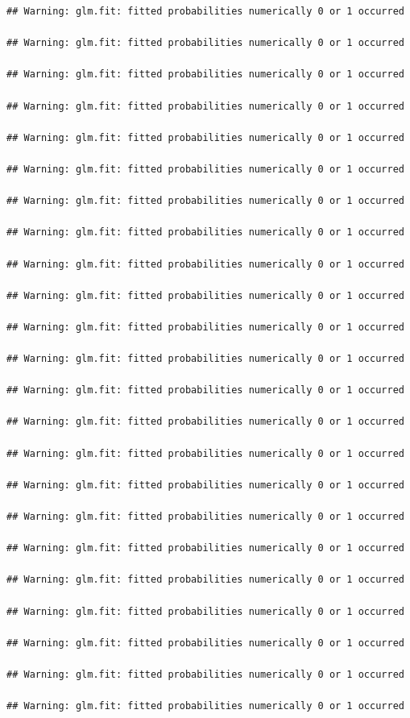 \documentclass[]{book}
\begin{document}
\begin{verbatim}
## Warning: glm.fit: fitted probabilities numerically 0 or 1 occurred

## Warning: glm.fit: fitted probabilities numerically 0 or 1 occurred

## Warning: glm.fit: fitted probabilities numerically 0 or 1 occurred

## Warning: glm.fit: fitted probabilities numerically 0 or 1 occurred

## Warning: glm.fit: fitted probabilities numerically 0 or 1 occurred

## Warning: glm.fit: fitted probabilities numerically 0 or 1 occurred

## Warning: glm.fit: fitted probabilities numerically 0 or 1 occurred

## Warning: glm.fit: fitted probabilities numerically 0 or 1 occurred

## Warning: glm.fit: fitted probabilities numerically 0 or 1 occurred

## Warning: glm.fit: fitted probabilities numerically 0 or 1 occurred

## Warning: glm.fit: fitted probabilities numerically 0 or 1 occurred

## Warning: glm.fit: fitted probabilities numerically 0 or 1 occurred

## Warning: glm.fit: fitted probabilities numerically 0 or 1 occurred

## Warning: glm.fit: fitted probabilities numerically 0 or 1 occurred

## Warning: glm.fit: fitted probabilities numerically 0 or 1 occurred

## Warning: glm.fit: fitted probabilities numerically 0 or 1 occurred

## Warning: glm.fit: fitted probabilities numerically 0 or 1 occurred

## Warning: glm.fit: fitted probabilities numerically 0 or 1 occurred

## Warning: glm.fit: fitted probabilities numerically 0 or 1 occurred

## Warning: glm.fit: fitted probabilities numerically 0 or 1 occurred

## Warning: glm.fit: fitted probabilities numerically 0 or 1 occurred

## Warning: glm.fit: fitted probabilities numerically 0 or 1 occurred

## Warning: glm.fit: fitted probabilities numerically 0 or 1 occurred


\end{verbatim}
\end{document}
